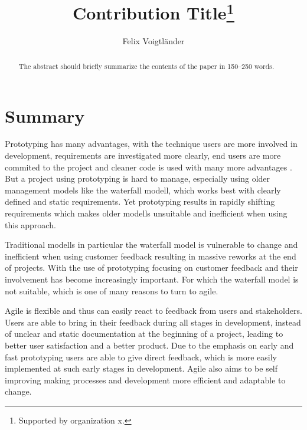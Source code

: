 \documentclass[runningheads]{llncs}
\begin{document}
%
\title{Contribution Title\thanks{Supported by organization x.}}
%
%
\author{Felix Voigtländer}
%
%
%
\maketitle              %
%
\begin{abstract}
The abstract should briefly summarize the contents of the paper in
150--250 words.

\end{abstract}
%
%
%
\section{Summary}

Prototyping has many advantages, with the technique users are more involved in development, requirements are investigated more clearly, 
end users are more commited to the project and cleaner code is used with many more advantages \cite{ref_proto_prac}. But a project using prototyping is hard to manage,
especially using older management models like the waterfall modell, which works best with clearly defined and static requirements.
Yet prototyping results in rapidly shifting requirements \cite{ref_proto_prac} \cite{ref_proto_ui} which makes older modells unsuitable and
inefficient when using this approach.

Traditional modells in particular the waterfall model is vulnerable to change and inefficient when using customer feedback resulting in massive reworks 
at the end of projects. With the use of prototyping focusing on customer feedback and their involvement has become increasingly important. 
For which the waterfall model is not suitable, which is one of many reasons to turn to agile.

Agile is flexible and thus can easily react to feedback from users and stakeholders. Users are able to bring in their feedback during 
all stages in development, instead of unclear and static documentation at the beginning of a project, leading to better user satisfaction and 
a better product. Due to the emphasis on early and fast prototyping users are able to give direct feedback, which is more easily implemented at such early stages 
in development. Agile also aims to be self improving making processes and development more efficient and adaptable to change.
\end{document}
